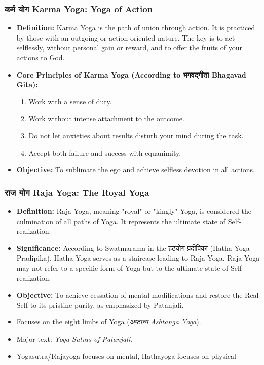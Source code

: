 \begin{frame}[fragile]\frametitle{कर्म योग  Karma Yoga: Yoga of Action}
          \begin{itemize}
	  \item \textbf{Definition:} Karma Yoga is the path of union through action. It is practiced by those with an outgoing or action-oriented nature. The key is to act selflessly, without personal gain or reward, and to offer the fruits of your actions to God.

 
	  \item \textbf{Core Principles of Karma Yoga (According to भगवद्गीता Bhagavad Gita):}
    \begin{enumerate}
        \item Work with a sense of duty.
        \item Work without intense attachment to the outcome.
        \item Do not let anxieties about results disturb your mind during the task.
        \item Accept both failure and success with equanimity.
    \end{enumerate}

	  \item  \textbf{Objective:} To sublimate the ego and achieve selfless devotion in all actions.
	      \end{itemize}

\end{frame}

\begin{frame}[fragile]\frametitle{राज  योग  Raja Yoga: The Royal Yoga}
    
      \begin{itemize}
	  \item \textbf{Definition:} Raja Yoga, meaning "royal" or "kingly" Yoga, is considered the culmination of all paths of Yoga. It represents the ultimate state of Self-realization.
	  \item  \textbf{Significance:} According to Swatmarama in the हठयोग प्रदीपिका (Hatha Yoga Pradipika), Hatha Yoga serves as a staircase leading to Raja Yoga. Raja Yoga may not refer to a specific form of Yoga but to the ultimate state of Self-realization.
	  \item \textbf{Objective:} To achieve cessation of mental modifications and restore the Real Self to its pristine purity, as emphasized by Patanjali.
		\item Focuses on the eight limbs of Yoga (\textit{अष्टान्ग Ashtanga Yoga}).
		\item Major text: \textit{Yoga Sutras of Patanjali}.
		\item Yogasutra/Rajayoga focuses on mental, Hathayoga focuses on physical
	  \end{itemize}
    
\end{frame}

